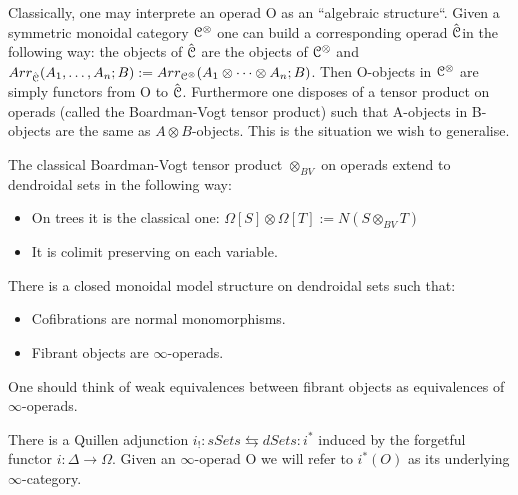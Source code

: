\begin{refsection}
\begin{remark}
\end{remark}

Classically, one may interprete an operad O as an ``algebraic structure``. Given a symmetric monoidal category $\mathcal{C}^{\otimes}$ one can build a corresponding operad $\hat{\mathcal{C}}$in the
following way: the objects of $\hat{\mathcal{C}}$ are the objects of $\mathcal{C}^{\otimes}$ and $Arr_{\hat{\mathcal{C}}}(A_1,\dots,A_n;B):=Arr_{\mathcal{C}^{\otimes}}(A_1\otimes\dots\otimes A_n;B)$.
Then O-objects in $\mathcal{C}^{\otimes}$ are simply functors from O to $\hat{\mathcal{C}}$. Furthermore one disposes of a tensor product on operads (called the Boardman-Vogt tensor product)
such that A-objects in B-objects are the same as $A\otimes B$-objects. This is the situation we wish to generalise.

The classical Boardman-Vogt tensor product $\otimes_{BV}$ on operads extend to dendroidal sets in the following way:
\begin{itemize}
 \item On trees it is the classical one: $\Omega[S]\otimes\Omega[T]:=N(S\otimes_{BV}T)$
\item It is colimit preserving on each variable.
\end{itemize}

\begin{proposition} \cite{Mo-We}
There is a closed monoidal model structure on dendroidal sets such that:
\begin{itemize}
 \item Cofibrations are normal monomorphisms.
 \item Fibrant objects are $\infty$-operads.
\end{itemize}

One should think of weak equivalences between fibrant objects as equivalences of $\infty$-operads.
\end{proposition}

\begin{remark}
There is a Quillen adjunction $i_!: sSets \leftrightarrows dSets: i^*$ induced by the forgetful functor $i: \Delta \to \Omega$. Given an $\infty$-operad O we will refer
to $i^*(O)$ as its underlying $\infty$-category.
\end{remark}



\end{refsection}
